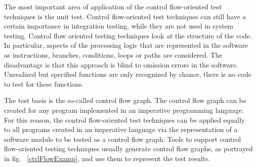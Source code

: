 	The most important area of application of the control flow-oriented test techniques is the unit test. Control flow-oriented test techniques can still have a certain importance in integration testing, while they are not used in system testing. Control flow oriented testing techniques look at the structure of the code. In particular, aspects of the processing logic that are represented in the software as instructions, branches, conditions, loops or paths are considered. The disadvantage is that this approach is blind to omission errors in the software. Unrealized but specified functions are only recognized by chance, there is no code to test for these functions.

	The test basis is the so-called control flow graph. The control flow graph can be created for any program implemented in an imperative programming language. For this reason, the control flow-oriented test techniques can be applied equally to all programs created in an imperative language via the representation of a software module to be tested as a control flow graph. Tools to support control flow-oriented testing techniques usually generate control flow graphs, as portrayed in fig. ~\ref{ctrlFlowExamp}, and use them to represent the test results.
	

